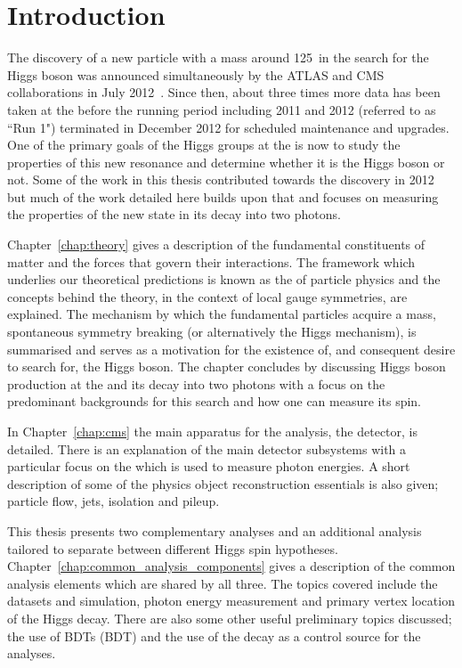 \chapter{Introduction}
\label{chap:intro}

The discovery of a new particle with a mass around 125~\GeV in the search for the \SM Higgs boson was announced simultaneously by the ATLAS and CMS collaborations in July 2012~\cite{ATLASDiscovery,CMSDiscovery}. Since then, about three times more data has been taken at the \LHC before the running period including 2011 and 2012 (referred to as ``Run 1") terminated in December 2012 for scheduled maintenance and upgrades. One of the primary goals of the Higgs groups at the \LHC is now to study the properties of this new resonance and determine whether it is the \SM Higgs boson or not. Some of the work in this thesis contributed towards the discovery in 2012 but much of the work detailed here builds upon that and focuses on measuring the properties of the new state in its decay into two photons. 

Chapter~\ref{chap:theory} gives a description of the fundamental constituents of matter and the forces that govern their interactions. The framework which underlies our theoretical predictions is known as the \SM of particle physics and the concepts behind the theory, in the context of local gauge symmetries, are explained. The mechanism by which the fundamental particles acquire a mass, spontaneous symmetry breaking (or alternatively the Higgs mechanism), is summarised and serves as a motivation for the existence of, and consequent desire to search for, the Higgs boson. The chapter concludes by discussing Higgs boson production at the \LHC and its decay into two photons with a focus on the predominant backgrounds for this search and how one can measure its spin.

In Chapter~\ref{chap:cms} the main apparatus for the analysis, the \CMS detector, is detailed. There is an explanation of the main detector subsystems with a particular focus on the \ECAL which is used to measure photon energies. A short description of some of the physics object reconstruction essentials is also given; particle flow, jets, isolation and pileup.

This thesis presents two complementary analyses and an additional analysis tailored to separate between different Higgs spin hypotheses. Chapter~\ref{chap:common_analysis_components} gives a description of the common analysis elements which are shared by all three. The topics covered include the datasets and \MC simulation, photon energy measurement and primary vertex location of the Higgs decay. There are also some other useful preliminary topics discussed; the use of \aclp{BDT} (\acs{BDT}) and the use of the \Zee decay as a control source for the \Hgg analyses.

